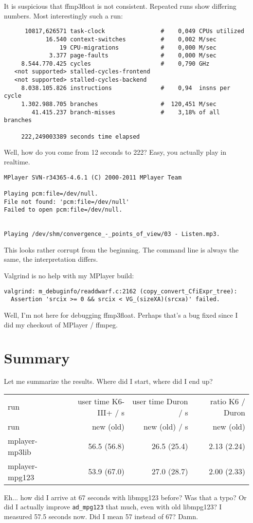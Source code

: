 \documentclass[a4paper,12pt]{scrartcl}
\begin{document}
It is suspicious that ffmp3float is not consistent. Repeated runs show differing numbers. Most interestingly such a run:
\begin{verbatim}
      10817,626571 task-clock                #    0,049 CPUs utilized          
            16.540 context-switches          #    0,002 M/sec                  
                19 CPU-migrations            #    0,000 M/sec                  
             3.377 page-faults               #    0,000 M/sec                  
     8.544.770.425 cycles                    #    0,790 GHz                    
   <not supported> stalled-cycles-frontend 
   <not supported> stalled-cycles-backend  
     8.038.105.826 instructions              #    0,94  insns per cycle        
     1.302.988.705 branches                  #  120,451 M/sec                  
        41.415.237 branch-misses             #    3,18% of all branches        

     222,249003389 seconds time elapsed
\end{verbatim}
Well, how do you come from 12 seconds to 222? Easy, you actually play in realtime.
\begin{verbatim}
MPlayer SVN-r34365-4.6.1 (C) 2000-2011 MPlayer Team

Playing pcm:file=/dev/null.
File not found: 'pcm:file=/dev/null'
Failed to open pcm:file=/dev/null.


Playing /dev/shm/convergence_-_points_of_view/03 - Listen.mp3.
\end{verbatim}
This looks rather corrupt from the beginning. The command line is always the same, the interpretation differs.

Valgrind is no help with my MPlayer build:
\begin{verbatim}
valgrind: m_debuginfo/readdwarf.c:2162 (copy_convert_CfiExpr_tree):
  Assertion 'srcix >= 0 && srcix < VG_(sizeXA)(srcxa)' failed.
\end{verbatim}
Well, I'm not here for debugging ffmp3float. Perhaps that's a bug fixed since I did my checkout of MPlayer / ffmpeg.

\section{Summary}

Let me summarize the results. Where did I start, where did I end up? 
\begin{center}
\begin{tabular}{lrrr}
run & user time K6-III+ / s & user time Duron / s & ratio K6 / Duron \\
run & new (old) & new (old) / s & new (old) \\
\hline
mplayer-mp3lib & 56.5 (56.8) & 26.5 (25.4) & 2.13 (2.24) \\
mplayer-mpg123 & 53.9 (67.0) & 27.0 (28.7) & 2.00 (2.33)
\end{tabular}
\end{center}
Eh... how did I arrive at 67 seconds with libmpg123 before? Was that a typo? Or did I actually improve \verb:ad_mpg123: that much, even with old libmpg123? I measured 57.5 seconds now. Did I mean 57 instead of 67? Damn.
\end{document}
